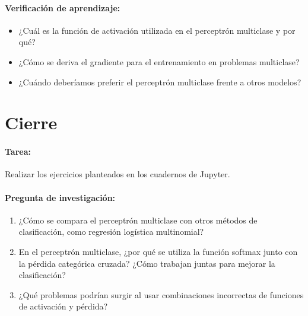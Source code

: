 \documentclass[a4,11pt]{aleph-notas}
\begin{document}
\paragraph{Verificación de aprendizaje:}  
\begin{itemize}[leftmargin=*]
    \item ¿Cuál es la función de activación utilizada en el perceptrón multiclase y por qué?
    \item ¿Cómo se deriva el gradiente para el entrenamiento en problemas multiclase?
    \item ¿Cuándo deberíamos preferir el perceptrón multiclase frente a otros modelos?
\end{itemize}


\section*{Cierre}

\paragraph{Tarea:}
    Realizar los ejercicios planteados en los cuadernos de Jupyter.

\paragraph{Pregunta de investigación:}  
\begin{enumerate}[leftmargin=*]
    \item ¿Cómo se compara el perceptrón multiclase con otros métodos de clasificación, como regresión logística multinomial?
    \item En el perceptrón multiclase, ¿por qué se utiliza la función softmax junto con la pérdida categórica cruzada? ¿Cómo trabajan juntas para mejorar la clasificación?
    \item ¿Qué problemas podrían surgir al usar combinaciones incorrectas de funciones de activación y pérdida?
\end{enumerate}
    
\end{document}
